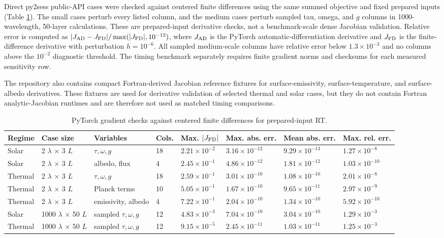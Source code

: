 \documentclass[gmd, manuscript]{copernicus}
\begin{document}
Direct py2sess public-API cases were checked against centered finite differences
using the same summed objective and fixed prepared inputs (Table
\ref{tab:gradient_validation}).  The small cases perturb every listed column, and the
medium cases perturb sampled tau, omega, and $g$ columns in 1000-wavelength,
50-layer calculations.  These are prepared-input derivative checks, not a
benchmark-scale dense Jacobian validation.  Relative error is computed as
$|J_{\rm AD}-J_{\rm FD}|/\max(|J_{\rm FD}|,10^{-12})$, where $J_{\rm AD}$ is the
PyTorch automatic-differentiation derivative and $J_{\rm FD}$ is the finite-difference
derivative with perturbation $h=10^{-6}$.  All sampled medium-scale columns have
relative error below $1.3\times10^{-3}$ and no columns above the $10^{-2}$ diagnostic
threshold.  The timing benchmark separately requires finite gradient norms and
checksums for each measured sensitivity row.

The repository also contains compact Fortran-derived Jacobian reference fixtures for
surface-emissivity, surface-temperature, and surface-albedo derivatives.  These
fixtures are used for derivative validation of selected thermal and solar cases, but
they do not contain Fortran analytic-Jacobian runtimes and are therefore not used as
matched timing comparisons.

\begin{table}[t]
  \caption{PyTorch gradient checks against centered finite differences for
  prepared-input RT.}
  \label{tab:gradient_validation}
  \centering
  \scriptsize
  \begin{tabular}{llllllll}
  \hline
  Regime & Case size & Variables & Cols. & Max. $|J_{\rm FD}|$ &
  Max. abs. err. & Mean abs. err. & Max. rel. err. \\
  \hline
  Solar & 2 $\lambda$ $\times$ 3 $L$ & $\tau,\omega,g$ & 18 &
  $2.21\times10^{-2}$ & $3.16\times10^{-12}$ & $9.29\times10^{-13}$ & $1.27\times10^{-8}$ \\
  Solar & 2 $\lambda$ $\times$ 3 $L$ & albedo, flux & 4 &
  $2.45\times10^{-1}$ & $4.86\times10^{-12}$ & $1.81\times10^{-12}$ & $1.03\times10^{-10}$ \\
  Thermal & 2 $\lambda$ $\times$ 3 $L$ & $\tau,\omega,g$ & 18 &
  $2.59\times10^{-1}$ & $3.01\times10^{-10}$ & $1.08\times10^{-10}$ & $2.01\times10^{-8}$ \\
  Thermal & 2 $\lambda$ $\times$ 3 $L$ & Planck terms & 10 &
  $5.05\times10^{-1}$ & $1.67\times10^{-10}$ & $9.65\times10^{-11}$ & $2.97\times10^{-9}$ \\
  Thermal & 2 $\lambda$ $\times$ 3 $L$ & emissivity, albedo & 4 &
  $7.22\times10^{-1}$ & $2.04\times10^{-10}$ & $1.34\times10^{-10}$ & $5.92\times10^{-10}$ \\
  Solar & 1000 $\lambda$ $\times$ 50 $L$ & sampled $\tau,\omega,g$ & 12 &
  $4.83\times10^{-3}$ & $7.04\times10^{-10}$ & $3.04\times10^{-10}$ & $1.29\times10^{-3}$ \\
  Thermal & 1000 $\lambda$ $\times$ 50 $L$ & sampled $\tau,\omega,g$ & 12 &
  $9.15\times10^{-5}$ & $2.45\times10^{-11}$ & $1.03\times10^{-11}$ & $1.25\times10^{-3}$ \\
  \hline
  \end{tabular}
\end{table}
\end{document}
